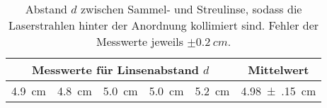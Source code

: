 \documentclass[ngerman,pstricks,border=12pt]{standalone}
\begin{document}
\setcounter{table}{3}
\begin{table}
\centering
\begin{tabular}{c c c c c | c}
		\multicolumn{5}{c|}{Messwerte für Linsenabstand $d$} & Mittelwert \\ \hline
		\SI{4.9}{cm} & \SI{4.8}{cm} & \SI{5.0}{cm} & \SI{5.0}{cm} & \SI{5.2}{cm} & \SI{4.98(15)}{cm}
\end{tabular}
\caption{Abstand $d$ zwischen Sammel- und Streulinse, sodass die Laserstrahlen hinter der Anordnung kollimiert sind. Fehler der Messwerte jeweils $\pm\SI{0.2}{cm}$.}
\label{tab:koll}
\end{table}
\end{document}

